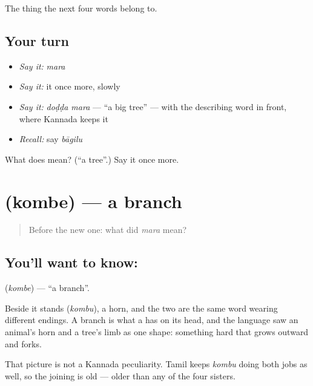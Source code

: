 \begin{grammarlens}[title={What you've built}]
The thing the next four words belong to.
\end{grammarlens}

\subsection*{Your turn}
\begin{itemize}
\raggedright
  \item \emph{Say it:} \emph{mara}
  \item \emph{Say it:} it once more, slowly
  \item \emph{Say it:} \emph{doḍḍa mara} — \textquotedblleft{}a big tree\textquotedblright{} — with the describing word in front, where Kannada keeps it
  \item \emph{Recall:} say \emph{bāgilu}
\end{itemize}

\begin{tcolorbox}[breakable,colback=teal!4,colframe=teal!35!black,title={Before you move on}]
What does  mean? (\textquotedblleft{}a tree\textquotedblright{}.) Say it once more.
\end{tcolorbox}
\section[\texorpdfstring{\kn{ಕೊಂಬೆ} (kombe)}{ಕೊಂಬೆ (kombe)}]{ (kombe) — a branch}

\label{lesson:KA-C54-branch}



\begin{quote}
Before the new one: what did \emph{mara} mean?
\end{quote}

\subsection*{You'll want to know: }
\textbf{} (\emph{kombe}) — \textquotedblleft{}a branch\textquotedblright{}.

Beside it stands  (\emph{kombu}), a horn, and the two are the same word wearing different endings. A branch is what a  has on its head, and the language saw an animal's horn and a tree's limb as one shape: something hard that grows outward and forks.

That picture is not a Kannada peculiarity. Tamil keeps \emph{kombu} doing both jobs as well, so the joining is old — older than any of the four sisters.

